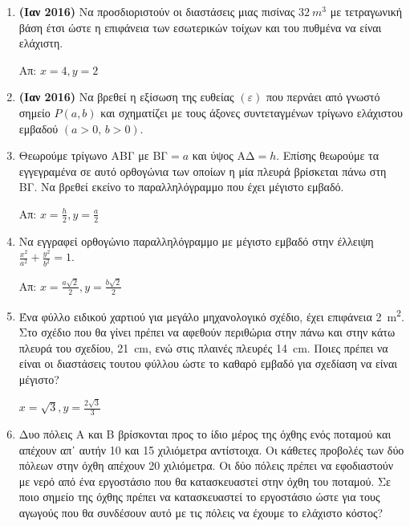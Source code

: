 






\begin{center}
\end{center}

\vspace{\baselineskip}

\begin{enumerate}

	\item {\bfseries (Ιαν 2016)} Να προσδιοριστούν οι διαστάσεις μιας πισίνας $ \SI{32}{m^{3}} $ με
		τετραγωνική βάση έτσι ώστε η επιφάνεια των εσωτερικών τοίχων και του
		πυθμένα να είναι ελάχιστη. 

		\hfill Απ: $x=4, y=2$

	\item {\bfseries (Ιαν 2016)} Να βρεθεί η εξίσωση της ευθείας $ (\varepsilon)
		$ που περνάει από γνωστό σημείο $ P(a,b) $ και σχηματίζει με τους άξονες
		συντεταγμένων τρίγωνο ελάχιστου εμβαδού $ (a>0,\, b>0) $.

	\item Θεωρούμε τρίγωνο ΑΒΓ με  ΒΓ$=a $ και ύψος ΑΔ$=h$. Επίσης θεωρούμε τα
		εγγεγραμένα σε αυτό ορθογώνια των οποίων η μία πλευρά βρίσκεται πάνω στη
		ΒΓ. Να βρεθεί εκείνο το παραλληλόγραμμο που έχει μέγιστο εμβαδό.
		
		\hfill Απ: $ x = \frac{h}{2}, y= \frac{a}{2} $

	\item Να εγγραφεί ορθογώνιο παραλληλόγραμμο με μέγιστο εμβαδό στην έλλειψη $
		\frac{x^{2}}{a^{2}} + \frac{y^{2}}{b^{2}} = 1 $. 

		\hfill Απ: $ x = \frac{a\sqrt{2}}{2}, y = \frac{b \sqrt{2}}{2} $

	\item Ένα φύλλο ειδικού χαρτιού για μεγάλο μηχανολογικό σχέδιο, έχει
		επιφάνεια \SI{2}{m^{2}}. Στο σχέδιο που θα γίνει πρέπει να αφεθούν
		περιθώρια στην πάνω και στην κάτω πλευρά του σχεδίου, \SI{21}{cm}, ενώ
		στις πλαινές πλευρές \SI{14}{cm}. Ποιες πρέπει να είναι οι διαστάσεις
		τουτου φύλλου ώστε το καθαρό εμβαδό για σχεδίαση να είναι μέγιστο?

		\hfill $ x = \sqrt{3}, y = \frac{2 \sqrt{3}}{3} $

	\item Δυο πόλεις Α και Β βρίσκονται προς το ίδιο μέρος της όχθης ενός
		ποταμού και απέχουν απ᾽ αυτήν 10 και 15 χιλιόμετρα αντίστοιχα. Οι
		κάθετες προβολές των δύο πόλεων στην όχθη απέχουν 20 χιλιόμετρα. Οι δύο
		πόλεις πρέπει να εφοδιαστούν με νερό από ένα εργοστάσιο που θα
		κατασκευαστεί στην όχθη του ποταμού. Σε ποιο σημείο της όχθης πρέπει να
		κατασκευαστεί το εργοστάσιο ώστε για τους αγωγούς που θα συνδέσουν αυτό
		με τις πόλεις να έχουμε το ελάχιστο κόστος?


\end{enumerate}
